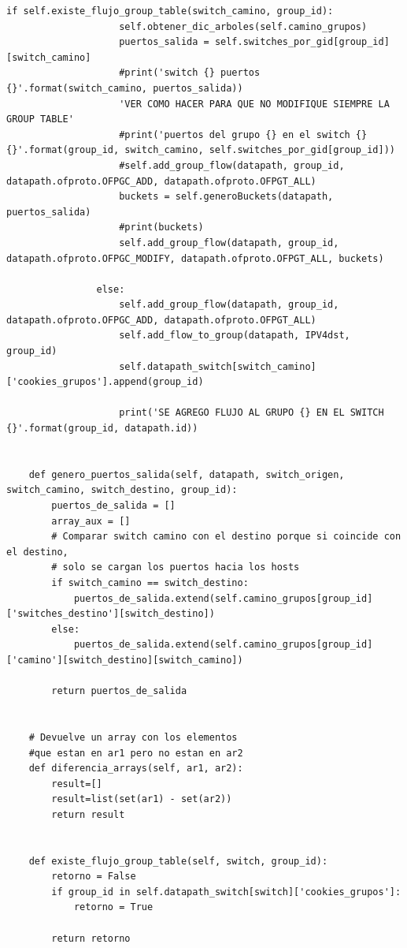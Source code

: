 \documentclass[12pt,a4paper,oneside]{book}
\begin{document}
\begin{lstlisting}[style=codigobase,  label = cod_correrP, caption= controlador.py]
                if self.existe_flujo_group_table(switch_camino, group_id):
                    self.obtener_dic_arboles(self.camino_grupos)
                    puertos_salida = self.switches_por_gid[group_id][switch_camino]
                    #print('switch {} puertos {}'.format(switch_camino, puertos_salida))
                    'VER COMO HACER PARA QUE NO MODIFIQUE SIEMPRE LA GROUP TABLE'
                    #print('puertos del grupo {} en el switch {} {}'.format(group_id, switch_camino, self.switches_por_gid[group_id]))
                    #self.add_group_flow(datapath, group_id, datapath.ofproto.OFPGC_ADD, datapath.ofproto.OFPGT_ALL)
                    buckets = self.generoBuckets(datapath, puertos_salida)
                    #print(buckets)
                    self.add_group_flow(datapath, group_id, datapath.ofproto.OFPGC_MODIFY, datapath.ofproto.OFPGT_ALL, buckets)

                else:
                    self.add_group_flow(datapath, group_id, datapath.ofproto.OFPGC_ADD, datapath.ofproto.OFPGT_ALL)
                    self.add_flow_to_group(datapath, IPV4dst, group_id)
                    self.datapath_switch[switch_camino]['cookies_grupos'].append(group_id)

                    print('SE AGREGO FLUJO AL GRUPO {} EN EL SWITCH {}'.format(group_id, datapath.id))


    def genero_puertos_salida(self, datapath, switch_origen, switch_camino, switch_destino, group_id):
        puertos_de_salida = []
        array_aux = []
        # Comparar switch camino con el destino porque si coincide con el destino,
        # solo se cargan los puertos hacia los hosts
        if switch_camino == switch_destino:
            puertos_de_salida.extend(self.camino_grupos[group_id]['switches_destino'][switch_destino])
        else:
            puertos_de_salida.extend(self.camino_grupos[group_id]['camino'][switch_destino][switch_camino])

        return puertos_de_salida


    # Devuelve un array con los elementos
    #que estan en ar1 pero no estan en ar2
    def diferencia_arrays(self, ar1, ar2):
        result=[]
        result=list(set(ar1) - set(ar2))
        return result


    def existe_flujo_group_table(self, switch, group_id):
        retorno = False
        if group_id in self.datapath_switch[switch]['cookies_grupos']:
            retorno = True

        return retorno



\end{lstlisting}
\end{document}
